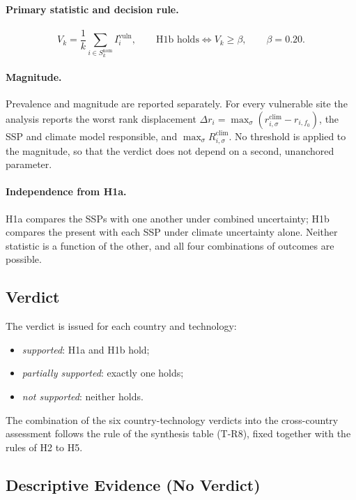 \paragraph{Primary statistic and decision rule.}
\begin{equation}
    V_k=\frac{1}{k}\sum_{i\in S^{\mathrm{nom}}_{k}} I^{\mathrm{vuln}}_{i},
    \qquad
    \text{H1b holds}\iff V_k\geq\beta,\qquad \beta=0.20.
    \label{eq:h1b_rule}
\end{equation}

\paragraph{Magnitude.}
Prevalence and magnitude are reported separately. For every vulnerable site
the analysis reports the worst rank displacement
$\Delta r_i=\max_{\sigma}\left(r^{\mathrm{clim}}_{i,\sigma}-r_{i,f_0}\right)$,
the SSP and climate model responsible, and $\max_{\sigma}R^{\mathrm{clim}}_{i,\sigma}$.
No threshold is applied to the magnitude, so that the verdict does not depend
on a second, unanchored parameter.

\paragraph{Independence from H1a.}
H1a compares the SSPs with one another under combined uncertainty; H1b compares
the present with each SSP under climate uncertainty alone. Neither statistic is
a function of the other, and all four combinations of outcomes are possible.

\subsection{Verdict}
\label{subsec:h1_verdict}

The verdict is issued for each country and technology:
\begin{itemize}
    \item \textit{supported}: H1a and H1b hold;
    \item \textit{partially supported}: exactly one holds;
    \item \textit{not supported}: neither holds.
\end{itemize}
The combination of the six country-technology verdicts into the cross-country
assessment follows the rule of the synthesis table (T-R8), fixed together with
the rules of H2 to H5.

\subsection{Descriptive Evidence (No Verdict)}
\label{subsec:h1_descriptive}

